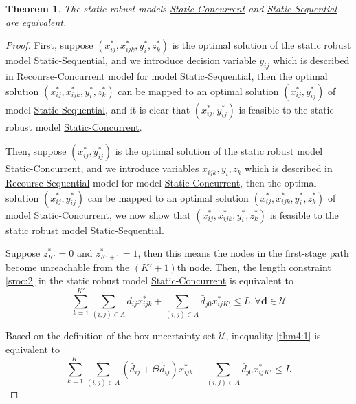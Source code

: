 \documentclass[preprint,review,10pt,round,authoryear]{elsarticle}\usepackage[]{graphicx}\usepackage[]{color}
\theoremstyle{plain}
\newtheorem{thm}{Theorem}
\theoremstyle{definition}
\theoremstyle{remark}
\begin{document}
\begin{thm}
\label{thm:4}
The static robust models \hyperref[sro:2]{Static-Concurrent} and \hyperref[sro:1]{Static-Sequential} are equivalent.
\end{thm}
\begin{proof}

First, suppose $(x_{ij}^*,x_{ijk}^*,y_i^*,z_k^*)$ is the optimal solution of the static robust model \hyperref[sro:1]{Static-Sequential}, and we introduce decision variable $y_{ij}$ which is described in \hyperref[eq:rc]{Recourse-Concurrent} model for model \hyperref[sro:1]{Static-Sequential}, then the optimal solution $(x_{ij}^*,x_{ijk}^*,y_i^*,z_k^*)$ can be mapped to an optimal solution $(x_{ij}^*,y_{ij}^*)$ of model \hyperref[sro:1]{Static-Sequential}, and it is clear that $(x_{ij}^*,y_{ij}^*)$ is feasible to the static robust model \hyperref[sro:2]{Static-Concurrent}.

Then, suppose $(x_{ij}^*,y_{ij}^*)$ is the optimal solution of the static robust model \hyperref[sro:2]{Static-Concurrent}, and we introduce variables $x_{ijk},y_i,z_k$ which is described in \hyperref[eq:rs]{Recourse-Sequential} model for model \hyperref[sro:2]{Static-Concurrent}, then the optimal solution $(x_{ij}^*,y_{ij}^*)$ can be mapped to an optimal solution $(x_{ij}^*,x_{ijk}^*,y_i^*,z_k^*)$ of model \hyperref[sro:2]{Static-Concurrent}, we now show that $(x_{ij}^*,x_{ijk}^*,y_i^*,z_k^*)$ is feasible to the static robust model  \hyperref[sro:1]{Static-Sequential}.

Suppose $z^*_{K'}=0$ and $z^*_{K'+1}=1$, then this means the nodes in the first-stage path become unreachable from the $(K'+1)$th node. Then, the length constraint \eqref{sroc:2} in the static robust model \hyperref[sro:2]{Static-Concurrent} is equivalent to
\begin{equation}
\sum_{k=1}^{K'}\sum_{(i,j)\in A}d_{ij}x^*_{ijk} + \sum_{(i,j)\in A}\bar{d}_{j0}x^*_{ijK'} \leq L,\forall \mathbf{d}\in\mathcal{U}\label{thm4:1}
\end{equation}

Based on the definition of the box uncertainty set $\mathcal{U}$, inequality \eqref{thm4:1} is equivalent to
\begin{equation}
\sum_{k=1}^{K'}\sum_{(i,j)\in A}(\bar{d}_{ij}+\Theta\hat{d}_{ij})x^*_{ijk} + \sum_{(i,j)\in A}\bar{d}_{j0}x^*_{ijK'} \leq L\label{thm4:2}
\end{equation}


\end{proof}
\end{document}
